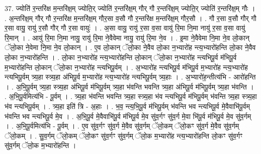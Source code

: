 \documentclass[17pt]{extarticle}
\begin{document}
37. ज्योति॑ र॒न्तरि॑क्ष म॒न्तरि॑क्ष॒म् ज्योति॒र् ज्योति॑ र॒न्तरि॑क्ष॒म् गौर् गौ र॒न्तरि॑क्ष॒म् ज्योति॒र् ज्योति॑ र॒न्तरि॑क्ष॒म् गौः । . अ॒न्तरि॑क्ष॒म् गौर् गौ र॒न्तरि॑क्ष म॒न्तरि॑क्ष॒म् गौर॒सा व॒सौ गौ र॒न्तरि॑क्ष म॒न्तरि॑क्ष॒म् गौर॒सौ । . गौ र॒सा व॒सौ गौर् गौ र॒सा वायु॒ रायु॑ र॒सौ गौर् गौ र॒सा वायुः॑ । . अ॒सा वायु॒ रायु॑ र॒सा व॒सा वायु॑ रि॒मा नि॒मा नायु॑ र॒सा व॒सा वायु॑ रि॒मान् । . आयु॑ रि॒मा नि॒मा नायु॒ रायु॑ रि॒मा ने॒वैवेमा नायु॒ रायु॑ रि॒मा ने॒व । . इ॒मा ने॒वैवेमा नि॒मा ने॒व लो॒कान् ॅलो॒का ने॒वेमा नि॒मा ने॒व लो॒कान् । . ए॒व लो॒कान् ॅलो॒का ने॒वैव लो॒का न॒भ्यारो॑ह न्त्य॒भ्यारो॑हन्ति लो॒का ने॒वैव लो॒का न॒भ्यारो॑हन्ति । . लो॒का न॒भ्यारो॑ह न्त्य॒भ्यारो॑हन्ति लो॒कान् ॅलो॒का न॒भ्यारो॑ह न्त्यभिपू॒र्व म॑भिपू॒र्व म॒भ्यारो॑हन्ति लो॒कान् ॅलो॒का न॒भ्यारो॑ह न्त्यभिपू॒र्वम् । . अ॒भ्यारो॑ह न्त्यभिपू॒र्व म॑भिपू॒र्व म॒भ्यारो॑ह न्त्य॒भ्यारो॑ह न्त्यभिपू॒र्वम् त्र्य॒हा स्त्र्य॒हा अ॑भिपू॒र्व म॒भ्यारो॑ह न्त्य॒भ्यारो॑ह न्त्यभिपू॒र्वम् त्र्य॒हाः । . अ॒भ्यारो॑ह॒न्तीत्य॑भि - आरो॑हन्ति । . अ॒भि॒पू॒र्वम् त्र्य॒हा स्त्र्य॒हा अ॑भिपू॒र्व म॑भिपू॒र्वम् त्र्य॒हा भ॑वन्ति भवन्ति त्र्य॒हा अ॑भिपू॒र्व म॑भिपू॒र्वम् त्र्य॒हा भ॑वन्ति । . अ॒भि॒पू॒र्वमित्य॑भि - पू॒र्वम् । . त्र्य॒हा भ॑वन्ति भवन्ति त्र्य॒हा स्त्र्य॒हा भ॑व न्त्यभिपू॒र्व म॑भिपू॒र्वम् भ॑वन्ति त्र्य॒हा स्त्र्य॒हा भ॑व न्त्यभिपू॒र्वम् । . त्र्य॒हा इति॑ त्रि - अ॒हाः । . भ॒व॒ न्त्य॒भि॒पू॒र्व म॑भिपू॒र्वम् भ॑वन्ति भव न्त्यभिपू॒र्व मे॒वैवाभि॑पू॒र्वम् भ॑वन्ति भव न्त्यभिपू॒र्व मे॒व । . अ॒भि॒पू॒र्व मे॒वैवाभि॑पू॒र्व म॑भिपू॒र्व मे॒व सु॑व॒र्गꣳ सु॑व॒र्ग मे॒वा भि॑पू॒र्व म॑भिपू॒र्व मे॒व सु॑व॒र्गम् । . अ॒भि॒पू॒र्वमित्य॑भि - पू॒र्वम् । . ए॒व सु॑व॒र्गꣳ सु॑व॒र्ग मे॒वैव सु॑व॒र्गम् ॅलो॒कम् ॅलो॒कꣳ सु॑व॒र्ग मे॒वैव सु॑व॒र्गम् ॅलो॒कम् । . सु॒व॒र्गम् ॅलो॒कम् ॅलो॒कꣳ सु॑व॒र्गꣳ सु॑व॒र्गम् ॅलो॒क म॒भ्यारो॑ह न्त्य॒भ्यारो॑हन्ति लो॒कꣳ सु॑व॒र्गꣳ सु॑व॒र्गम् ॅलो॒क म॒भ्यारो॑हन्ति । \newline
\end{document}
